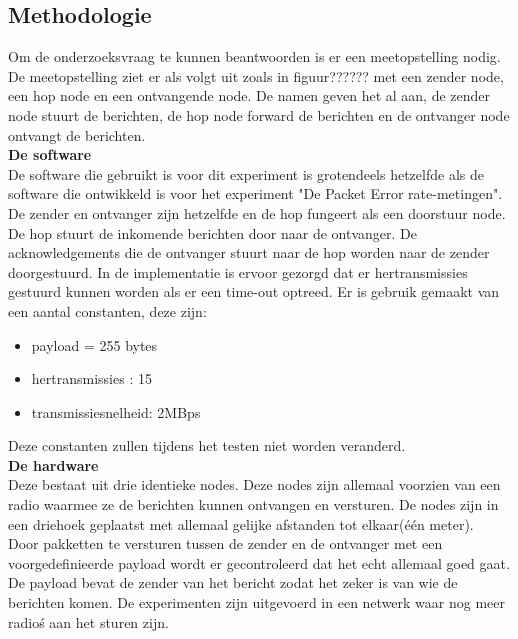 \documentclass{article}
\begin{document}
\subsection{Methodologie}
Om de onderzoeksvraag te kunnen beantwoorden is er een meetopstelling nodig. De meetopstelling ziet er als volgt uit zoals in figuur?????? met een zender node, een hop node en een ontvangende node.
De namen geven het al aan, de zender node stuurt de berichten, de hop node forward de berichten en de ontvanger node ontvangt de berichten.  
\\
\textbf{De software}
\\
De software die gebruikt is voor dit experiment is grotendeels hetzelfde als de software die ontwikkeld is voor het experiment "De Packet Error rate-metingen". De zender en ontvanger zijn hetzelfde en de hop fungeert als een doorstuur node. De hop stuurt de inkomende berichten door naar de ontvanger. De acknowledgements die de ontvanger stuurt naar de hop worden naar de zender doorgestuurd. 
In de implementatie is ervoor gezorgd dat er hertransmissies gestuurd kunnen worden als er een time-out optreed.
Er is gebruik gemaakt van een aantal constanten, deze zijn:
\\
\begin{itemize}
	\item payload = 255 bytes
	\item hertransmissies : 15
	\item transmissiesnelheid: 2MBps
\end{itemize}  
Deze constanten zullen tijdens het testen niet worden veranderd.
\\
\textbf{De hardware}
\\
Deze bestaat uit drie identieke nodes. Deze nodes zijn allemaal voorzien van een radio waarmee ze de berichten kunnen ontvangen en versturen. De nodes zijn in een driehoek geplaatst met allemaal gelijke afstanden tot elkaar(\'{e}\'{e}n meter).  
\\
Door pakketten te versturen tussen de zender en de ontvanger met een voorgedefinieerde payload wordt er gecontroleerd dat het echt allemaal goed gaat. De payload bevat de zender van het bericht zodat het zeker is van wie de berichten komen. De experimenten zijn uitgevoerd in een netwerk waar nog meer radio\'s aan het sturen zijn. 
\end{document}
